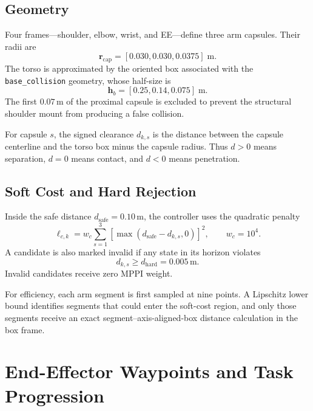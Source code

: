 \documentclass[11pt,a4paper]{article}
\newcommand{\code}[1]{\texttt{#1}}
\begin{document}
\subsection{Geometry}

Four frames---shoulder, elbow, wrist, and EE---define three arm capsules. Their
radii are
\begin{equation}
  \bm{r}_{\mathrm{cap}}=
  [0.030,0.030,0.0375]\;\mathrm{m}.
\end{equation}
The torso is approximated by the oriented box associated with the
\code{base\_collision} geometry, whose half-size is
\begin{equation}
  \bm{h}_b=[0.25,0.14,0.075]\;\mathrm{m}.
\end{equation}
The first $0.07\,\mathrm{m}$ of the proximal capsule is excluded to prevent
the structural shoulder mount from producing a false collision.

For capsule $s$, the signed clearance $d_{k,s}$ is the distance between the
capsule centerline and the torso box minus the capsule radius. Thus $d>0$
means separation, $d=0$ means contact, and $d<0$ means penetration.

\subsection{Soft Cost and Hard Rejection}

Inside the safe distance $d_{\mathrm{safe}}=0.10\,\mathrm{m}$, the controller
uses the quadratic penalty
\begin{equation}
  \boxed{
  \ell_{c,k}=
  w_c\sum_{s=1}^{3}
  \left[
    \max(d_{\mathrm{safe}}-d_{k,s},0)
  \right]^2,
  \qquad w_c=10^4.
  }
\end{equation}
A candidate is also marked invalid if any state in its horizon violates
\begin{equation}
  d_{k,s}\geq d_{\mathrm{hard}}=0.005\,\mathrm{m}.
\end{equation}
Invalid candidates receive zero MPPI weight.

For efficiency, each arm segment is first sampled at nine points. A Lipschitz
lower bound identifies segments that could enter the soft-cost region, and
only those segments receive an exact segment--axis-aligned-box distance
calculation in the box frame.

\section{End-Effector Waypoints and Task Progression}
\end{document}
